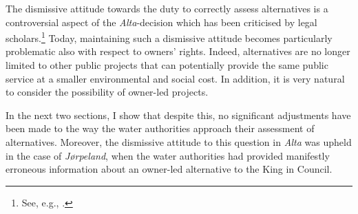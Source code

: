 The dismissive attitude towards the duty to correctly assess alternatives is a controversial aspect of the {\it Alta}-decision which has been criticised by legal scholars.\footnote{See, e.g., \cite[580-584]{backer86}.} Today, maintaining such a dismissive attitude becomes particularly problematic also with respect to owners' rights. Indeed, alternatives are no longer limited to other public projects that can potentially provide the same public service at a smaller environmental and social cost. In addition, it is very natural to consider the possibility of owner-led projects.

In the next two sections, I show that despite this, no significant adjustments have been made to the way the water authorities approach their assessment of alternatives. Moreover, the dismissive attitude to this question in {\it Alta} was upheld in the case of {\it Jørpeland}, when the water authorities had provided manifestly erroneous information about an owner-led alternative to the King in Council.

